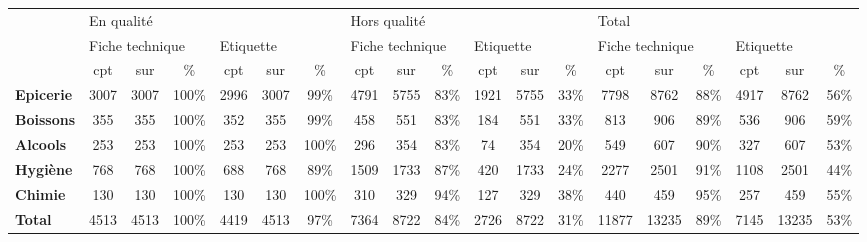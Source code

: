 \begin{tabular}{lcccccccccccccccccc}
\toprule
{} & \multicolumn{6}{l}{En qualité} & \multicolumn{6}{l}{Hors qualité} & \multicolumn{6}{l}{Total} \\
{} & \multicolumn{3}{l}{Fiche technique} & \multicolumn{3}{l}{Etiquette} & \multicolumn{3}{l}{Fiche technique} & \multicolumn{3}{l}{Etiquette} & \multicolumn{3}{l}{Fiche technique} & \multicolumn{3}{l}{Etiquette} \\
{} &             cpt &  sur &    \% &       cpt &  sur &    \% &             cpt &  sur &   \% &       cpt &  sur &   \% &             cpt &   sur &   \% &       cpt &   sur &   \% \\
\midrule
\textbf{Epicerie} &            3007 & 3007 & 100\% &      2996 & 3007 &  99\% &            4791 & 5755 & 83\% &      1921 & 5755 & 33\% &            7798 &  8762 & 88\% &      4917 &  8762 & 56\% \\
\textbf{Boissons} &             355 &  355 & 100\% &       352 &  355 &  99\% &             458 &  551 & 83\% &       184 &  551 & 33\% &             813 &   906 & 89\% &       536 &   906 & 59\% \\
\textbf{Alcools } &             253 &  253 & 100\% &       253 &  253 & 100\% &             296 &  354 & 83\% &        74 &  354 & 20\% &             549 &   607 & 90\% &       327 &   607 & 53\% \\
\textbf{Hygiène } &             768 &  768 & 100\% &       688 &  768 &  89\% &            1509 & 1733 & 87\% &       420 & 1733 & 24\% &            2277 &  2501 & 91\% &      1108 &  2501 & 44\% \\
\textbf{Chimie  } &             130 &  130 & 100\% &       130 &  130 & 100\% &             310 &  329 & 94\% &       127 &  329 & 38\% &             440 &   459 & 95\% &       257 &   459 & 55\% \\
\textbf{Total   } &            4513 & 4513 & 100\% &      4419 & 4513 &  97\% &            7364 & 8722 & 84\% &      2726 & 8722 & 31\% &           11877 & 13235 & 89\% &      7145 & 13235 & 53\% \\
\bottomrule
\end{tabular}
